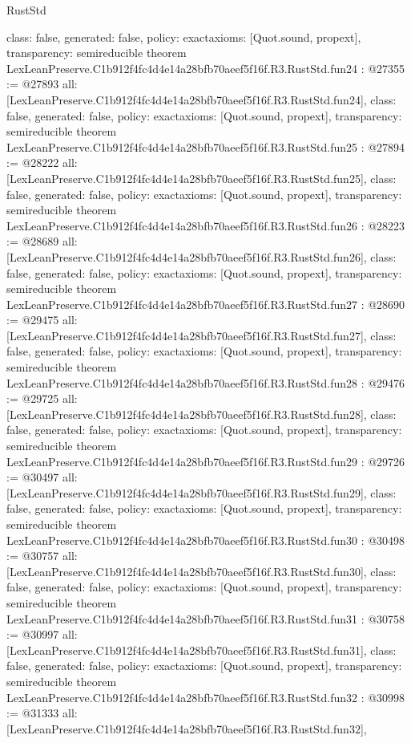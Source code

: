 \begin{lexlean}{RustStd}
\begin{coremodule}
{  class: false,
  generated: false,
  policy: exact{axioms: [Quot.sound, propext]},
  transparency: semireducible
}
theorem LexLeanPreserve.C1b912f4fc4d4e14a28bfb70aeef5f16f.R3.RustStd.fun24 : @27355 := @27893 {
  all: [LexLeanPreserve.C1b912f4fc4d4e14a28bfb70aeef5f16f.R3.RustStd.fun24],
  class: false,
  generated: false,
  policy: exact{axioms: [Quot.sound, propext]},
  transparency: semireducible
}
theorem LexLeanPreserve.C1b912f4fc4d4e14a28bfb70aeef5f16f.R3.RustStd.fun25 : @27894 := @28222 {
  all: [LexLeanPreserve.C1b912f4fc4d4e14a28bfb70aeef5f16f.R3.RustStd.fun25],
  class: false,
  generated: false,
  policy: exact{axioms: [Quot.sound, propext]},
  transparency: semireducible
}
theorem LexLeanPreserve.C1b912f4fc4d4e14a28bfb70aeef5f16f.R3.RustStd.fun26 : @28223 := @28689 {
  all: [LexLeanPreserve.C1b912f4fc4d4e14a28bfb70aeef5f16f.R3.RustStd.fun26],
  class: false,
  generated: false,
  policy: exact{axioms: [Quot.sound, propext]},
  transparency: semireducible
}
theorem LexLeanPreserve.C1b912f4fc4d4e14a28bfb70aeef5f16f.R3.RustStd.fun27 : @28690 := @29475 {
  all: [LexLeanPreserve.C1b912f4fc4d4e14a28bfb70aeef5f16f.R3.RustStd.fun27],
  class: false,
  generated: false,
  policy: exact{axioms: [Quot.sound, propext]},
  transparency: semireducible
}
theorem LexLeanPreserve.C1b912f4fc4d4e14a28bfb70aeef5f16f.R3.RustStd.fun28 : @29476 := @29725 {
  all: [LexLeanPreserve.C1b912f4fc4d4e14a28bfb70aeef5f16f.R3.RustStd.fun28],
  class: false,
  generated: false,
  policy: exact{axioms: [Quot.sound, propext]},
  transparency: semireducible
}
theorem LexLeanPreserve.C1b912f4fc4d4e14a28bfb70aeef5f16f.R3.RustStd.fun29 : @29726 := @30497 {
  all: [LexLeanPreserve.C1b912f4fc4d4e14a28bfb70aeef5f16f.R3.RustStd.fun29],
  class: false,
  generated: false,
  policy: exact{axioms: [Quot.sound, propext]},
  transparency: semireducible
}
theorem LexLeanPreserve.C1b912f4fc4d4e14a28bfb70aeef5f16f.R3.RustStd.fun30 : @30498 := @30757 {
  all: [LexLeanPreserve.C1b912f4fc4d4e14a28bfb70aeef5f16f.R3.RustStd.fun30],
  class: false,
  generated: false,
  policy: exact{axioms: [Quot.sound, propext]},
  transparency: semireducible
}
theorem LexLeanPreserve.C1b912f4fc4d4e14a28bfb70aeef5f16f.R3.RustStd.fun31 : @30758 := @30997 {
  all: [LexLeanPreserve.C1b912f4fc4d4e14a28bfb70aeef5f16f.R3.RustStd.fun31],
  class: false,
  generated: false,
  policy: exact{axioms: [Quot.sound, propext]},
  transparency: semireducible
}
theorem LexLeanPreserve.C1b912f4fc4d4e14a28bfb70aeef5f16f.R3.RustStd.fun32 : @30998 := @31333 {
  all: [LexLeanPreserve.C1b912f4fc4d4e14a28bfb70aeef5f16f.R3.RustStd.fun32],
}
\end{coremodule}
\end{lexlean}
